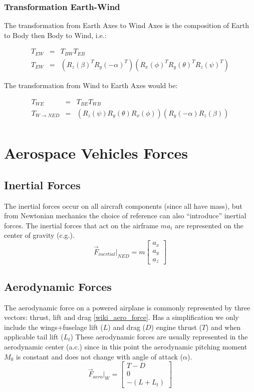 \subsubsection{Transformation Earth-Wind}
The transformation from Earth Axes to Wind Axes is the composition of Earth to Body
then Body to Wind, i.e.:

\begin{eqnarray}
    T_{EW} &=& T_{BW}T_{EB}\\
    T_{EW} &=& (R_z(\beta)^T R_y(-\alpha)^T) (R_x(\phi)^T R_y(\theta)^T  R_z(\psi)^T)
\end{eqnarray}

The transformation from Wind to Earth Axes would be:

\begin{eqnarray}
    T_{WE} &=& T_{BE}T_{WB}\\
    T_{W\rightarrow NED} &=& (R_z(\psi) R_y(\theta) R_x(\phi)) (R_y(-\alpha) R_z(\beta)) \\
\end{eqnarray}


\newpage
\section{Aerospace Vehicles Forces}
\subsection{Inertial Forces}
The inertial forces occur on all aircraft components (since all have mass), but from Newtonian mechanics the choice of reference can also
``introduce'' inertial forces. The inertial forces that act on the airframe $m a_i$ are represented on the center of gravity (c.g.).
\begin{equation}
  \vec{F}_{inertial}|_{NED} = m
    \begin{bmatrix}
      a_x\\
      a_y\\
      a_z
    \end{bmatrix}
\end{equation}


\subsection{Aerodynamic Forces}
The aerodynamic force on a powered airplane is commonly represented by three vectors: thrust, lift and drag \ref{wiki_aero_force}.
Has a simplification we only include the wings+fuselage lift ($L$) and drag ($D$) engine thrust ($T$) and when applicable tail lift ($L_t$)
These aerodynamic forces are usually represented in the aerodynamic center (a.c.) since in this point the aerodynamic pitching moment $M_0$ is constant
and does not change with angle of attack ($\alpha$).
\begin{equation}
  \vec{F}_{aero}|_{W} =
    \begin{bmatrix}
      T-D\\
      0\\
      -(L+L_t)
    \end{bmatrix}
\end{equation}



